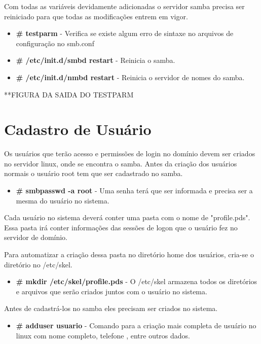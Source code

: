 Com todas as variáveis devidamente adicionadas o servidor samba precisa ser reiniciado para que todas as modificações entrem em vigor.

\begin{itemize}
	\item \textbf{\# testparm} - Verifica se existe algum erro de sintaxe no arquivos de configuração no smb.conf
	\item \textbf{\# /etc/init.d/smbd restart} - Reinicia o samba.
	\item \textbf{\# /etc/init.d/nmbd restart} - Reinicia o servidor de nomes do samba.
\end{itemize}

**FIGURA DA SAIDA DO TESTPARM

\section{Cadastro de Usuário}

Os usuários que terão acesso e permissões de login no domínio devem ser criados no servidor linux, onde se encontra o samba. Antes da criação dos usuários normais o usuário root tem que ser cadastrado no samba.

\begin{itemize}
	\item \textbf {\# smbpasswd -a root} - Uma senha terá que ser informada e precisa ser a mesma do usuário no sistema.
\end{itemize}

Cada usuário no sistema deverá conter uma pasta com o nome de "profile.pds". Essa pasta irá conter informações das sessões de logon que o usuário fez no servidor de domínio.

Para automatizar a criação dessa pasta no diretório home dos usuários, cria-se o diretório no /etc/skel.

\begin{itemize}
	\item \textbf{\# mkdir /etc/skel/profile.pds} - O /etc/skel armazena todos os diretórios e arquivos que serão criados juntos com o usuário no sistema.
\end{itemize}

Antes de cadastrá-los no samba eles precisam ser criados no sistema.

\begin{itemize}
	\item \textbf{\# adduser usuario} - Comando para a criação mais completa de usuário no linux com nome completo, telefone , entre outros dados.
\end{itemize}

